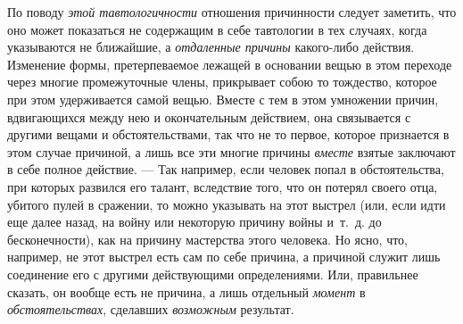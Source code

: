 По поводу {\em этой тавтологичности} отношения
причинности следует заметить, что оно может показаться не содержащим в себе
тавтологии в тех случаях, когда указываются не ближайшие, а
{\em отдаленные причины} какого-либо действия.
Изменение формы, претерпеваемое лежащей в основании вещью в этом переходе
через многие промежуточные члены, прикрывает собою то тождество, которое
при этом удерживается самой вещью. Вместе с тем в этом умножении причин,
вдвигающихся между нею и окончательным действием, она связывается с другими
вещами и обстоятельствами, так что не то первое, которое признается в этом
случае причиной, а лишь все эти многие причины
{\em вместе} взятые заключают в себе полное действие. —
Так например, если человек попал в обстоятельства, при которых развился его
талант, вследствие того, что он потерял своего отца, убитого пулей в
сражении, то можно указывать на этот выстрел (или, если идти еще далее
назад, на войну или некоторую причину войны и~т.~д. до бесконечности), как
на причину мастерства этого человека. Но ясно, что, например, не этот
выстрел есть сам по себе причина, а причиной служит лишь соединение его с
другими действующими определениями. Или, правильнее сказать, он вообще есть
не причина, а лишь отдельный {\em момент} в
{\em обстоятельствах}, сделавших
{\em возможным} результат.

